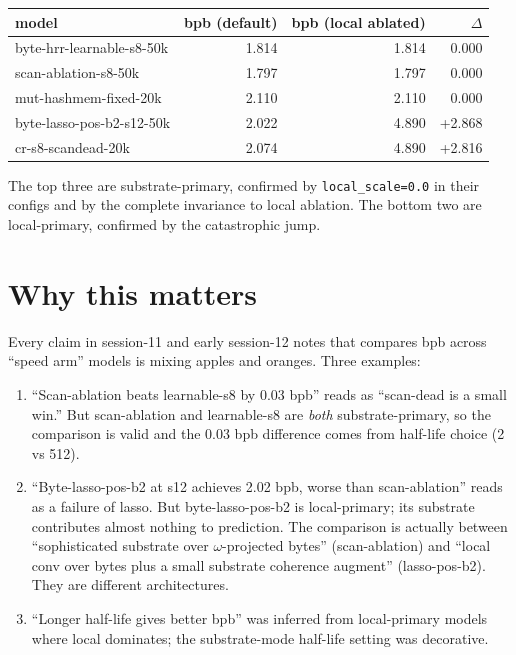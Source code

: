 \documentclass[11pt,openany]{book}
\begin{document}
\begin{longtable}{lrrr}
\toprule
model & bpb (default) & bpb (local ablated) & $\Delta$ \\
\midrule
byte-hrr-learnable-s8-50k           & 1.814 & 1.814 & 0.000 \\
scan-ablation-s8-50k                & 1.797 & 1.797 & 0.000 \\
mut-hashmem-fixed-20k               & 2.110 & 2.110 & 0.000 \\
\midrule
byte-lasso-pos-b2-s12-50k           & 2.022 & 4.890 & +2.868 \\
cr-s8-scandead-20k                  & 2.074 & 4.890 & +2.816 \\
\bottomrule
\end{longtable}

The top three are substrate-primary, confirmed by \texttt{local\_scale=0.0}
in their configs and by the complete invariance to local ablation. The
bottom two are local-primary, confirmed by the catastrophic jump.

\section{Why this matters}

Every claim in session-11 and early session-12 notes that compares bpb across
``speed arm'' models is mixing apples and oranges. Three examples:

\begin{enumerate}
  \item ``Scan-ablation beats learnable-s8 by 0.03 bpb'' reads as ``scan-dead is
  a small win.'' But scan-ablation and learnable-s8 are \emph{both}
  substrate-primary, so the comparison is valid and the 0.03 bpb difference
  comes from half-life choice (2 vs 512).
  \item ``Byte-lasso-pos-b2 at s12 achieves 2.02 bpb, worse than scan-ablation''
  reads as a failure of lasso. But byte-lasso-pos-b2 is local-primary; its
  substrate contributes almost nothing to prediction. The comparison is
  actually between ``sophisticated substrate over $\omega$-projected bytes''
  (scan-ablation) and ``local conv over bytes plus a small substrate
  coherence augment'' (lasso-pos-b2). They are different architectures.
  \item ``Longer half-life gives better bpb'' was inferred from local-primary
  models where local dominates; the substrate-mode half-life setting was
  decorative.
\end{enumerate}
\end{document}
